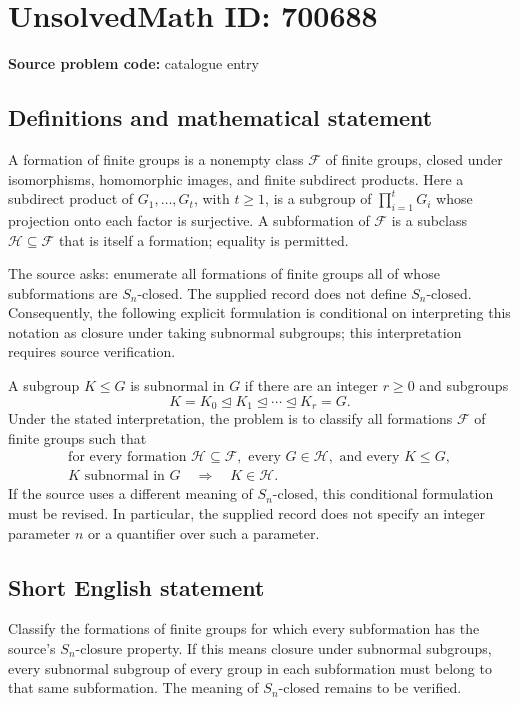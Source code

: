 \documentclass[11pt]{article}
\begin{document}
\section*{UnsolvedMath ID: 700688}
\textbf{Source problem code:} catalogue entry
\subsection{Definitions and mathematical statement}
A formation of finite groups is a nonempty class \(\mathcal F\) of finite groups, closed under isomorphisms, homomorphic images, and finite subdirect products. Here a subdirect product of \(G_1,\ldots,G_t\), with \(t\geq 1\), is a subgroup of \(\prod_{i=1}^t G_i\) whose projection onto each factor is surjective. A subformation of \(\mathcal F\) is a subclass \(\mathcal H\subseteq\mathcal F\) that is itself a formation; equality is permitted.

The source asks: enumerate all formations of finite groups all of whose subformations are \(S_n\)-closed. The supplied record does not define \(S_n\)-closed. Consequently, the following explicit formulation is conditional on interpreting this notation as closure under taking subnormal subgroups; this interpretation requires source verification.

A subgroup \(K\leq G\) is subnormal in \(G\) if there are an integer \(r\geq 0\) and subgroups
\[
K=K_0\trianglelefteq K_1\trianglelefteq\cdots\trianglelefteq K_r=G.
\]
Under the stated interpretation, the problem is to classify all formations \(\mathcal F\) of finite groups such that
\[
\begin{gathered}
\text{for every formation }\mathcal H\subseteq\mathcal F,
\text{ every }G\in\mathcal H,\text{ and every }K\leq G,\\
K\text{ subnormal in }G\quad\Longrightarrow\quad K\in\mathcal H.
\end{gathered}
\]
If the source uses a different meaning of \(S_n\)-closed, this conditional formulation must be revised. In particular, the supplied record does not specify an integer parameter \(n\) or a quantifier over such a parameter.
\subsection{Short English statement}
Classify the formations of finite groups for which every subformation has the source's \(S_n\)-closure property. If this means closure under subnormal subgroups, every subnormal subgroup of every group in each subformation must belong to that same subformation. The meaning of \(S_n\)-closed remains to be verified.
\end{document}
